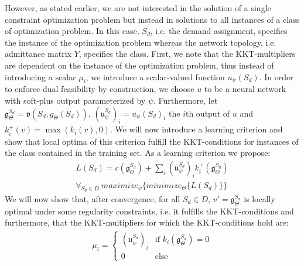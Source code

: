  However, as stated earlier, we are not interested in the solution of a single constraint optimization problem but instead in solutions to all instances of a class of optimization problem. In this case, $S_d$, i.e. the demand assignment, specifies the instance of the optimization problem whereas the network topology, i.e. admittance matrix $Y$, specifies the class. First, we note that the KKT-multipliers are dependent on the instance of the optimization problem, thus instead of introducing a scalar $\mu_i$, we introduce a scalar-valued function $u_\psi(S_d)$. In order to enforce dual feasibility by construction, we choose $u$ to be a neural network with soft-plus output parameterized by $\psi$.  Furthermore, let $\mathfrak{g}_\Theta^{S_d} = \mathfrak{v}(S_d, g_\Theta(S_d))$, $(\mathfrak{u}_\psi^{S_d})_i = u_\psi(S_d)_i$ the $i$th output of $u$ and $k_i^+(v) = \max(k_i(v),0)$. We will now introduce a learning criterion and show that local optima of this criterion fulfill the KKT-conditions for instances of the class contained in the training set. As a learning criterion we propose:
\begin{align}
L(S_d) = c(\mathfrak{g}_\Theta^{S_d}) + \sum_i (\mathfrak{u}_\psi^{S_d})_i k^+_i(\mathfrak{g}_\Theta^{S_d}) \label{minimal_loss}\\
\forall_{S_d \in D}\ maximize_\psi\{ minimize_\Theta\{ L(S_d) \} \} \label{eq:kkt_objective}
\end{align}
We will now show that, after convergence, for all $S_d \in D$, $v' = \mathfrak{g}_\Theta^{S_d}$ is locally optimal under some regularity constraints, i.e. it fulfills the KKT-conditions and furthermore, that the KKT-multipliers for which the KKT-conditions hold are:
\begin{align}
\mu_i = \begin{cases} (\mathfrak{u}_\psi^{S_d})_i &\text{if\ } k_i(\mathfrak{g}_\Theta^{S_d}) = 0 \label{eq:lag_mult}\\
0 &\text{else}
\end{cases}
\end{align}

